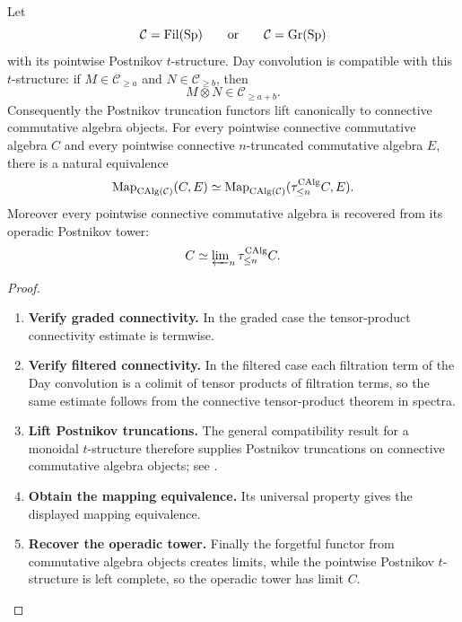 \begin{proposition}
\label{prop:filtered-graded-operadic-postnikov}
Let
\[
    \mathcal C=\operatorname{Fil}(\operatorname{Sp})
    \qquad\text{or}\qquad
    \mathcal C=\operatorname{Gr}(\operatorname{Sp})
\]
with its pointwise Postnikov \(t\)-structure. Day convolution is compatible
with this \(t\)-structure: if \(M\in\mathcal C_{\geq a}\) and
\(N\in\mathcal C_{\geq b}\), then
\[
    M\otimes N\in\mathcal C_{\geq a+b}.
\]
Consequently the Postnikov truncation functors lift canonically to connective
commutative algebra objects. For every pointwise connective commutative
algebra \(C\) and every pointwise connective \(n\)-truncated commutative
algebra \(E\), there is a natural equivalence
\[
    \operatorname{Map}_{\operatorname{CAlg}(\mathcal C)}(C,E)
    \simeq
    \operatorname{Map}_{\operatorname{CAlg}(\mathcal C)}(\tau_{\leq n}^{\operatorname{CAlg}}C,E).
\]
Moreover every pointwise connective commutative algebra is recovered from its
operadic Postnikov tower:
\[
    C\simeq\varprojlim\nolimits_n\tau_{\leq n}^{\operatorname{CAlg}}C.
\]
\end{proposition}

\begin{proof}
\leavevmode
\begin{enumerate}[label=\textup{(\arabic*)}]
    \item \textbf{Verify graded connectivity.}
    In the graded case the tensor-product connectivity estimate is termwise.
    \item \textbf{Verify filtered connectivity.}
    In
    the filtered case each filtration term of the Day convolution is a colimit of
    tensor products of filtration terms, so the same estimate follows from the
    connective tensor-product theorem in spectra.
    \item \textbf{Lift Postnikov truncations.}
    The general compatibility
    result for a monoidal \(t\)-structure therefore supplies Postnikov truncations
    on connective commutative algebra objects; see \cite{LurieHigherAlgebra}.
    \item \textbf{Obtain the mapping equivalence.}
    Its universal property gives the displayed mapping equivalence.
    \item \textbf{Recover the operadic tower.}
    Finally the
    forgetful functor from commutative algebra objects creates limits, while the
    pointwise Postnikov \(t\)-structure is left complete, so the operadic tower
    has limit \(C\).
\end{enumerate}
\end{proof}

